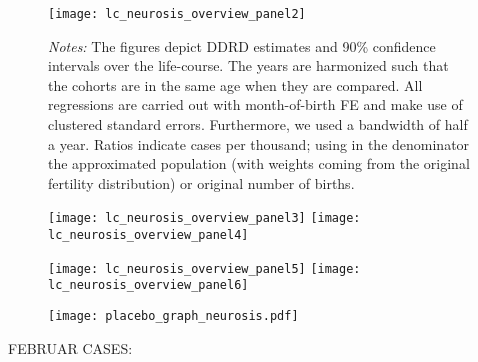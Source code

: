 \begin{landscape}
\begin{figure}[H]
\centering
\begin{minipage}{.9\linewidth}
\texttt{[image: lc\_neurosis\_overview\_panel2]}
{\scriptsize \emph{Notes:} The figures depict DDRD estimates and 90\% confidence intervals over the life-course. The years are harmonized such that the cohorts are in the same age when they are compared. All regressions are carried out with month-of-birth FE and make use of clustered standard errors. Furthermore, we used a bandwidth of half a year. Ratios indicate cases per thousand; using in the denominator the approximated population (with weights coming from the original fertility distribution) or original number of births. \par}
\end{minipage}
\end{figure}
\end{landscape}
\begin{figure}[H]%
	\centering
	\texttt{[image: lc\_neurosis\_overview\_panel3]}
	\texttt{[image: lc\_neurosis\_overview\_panel4]}
\end{figure}
\begin{figure}[H]
	\centering	
	\texttt{[image: lc\_neurosis\_overview\_panel5]}
	\texttt{[image: lc\_neurosis\_overview\_panel6]}
\end{figure}
%
\begin{figure}[H]%
	\centering
	\texttt{[image: placebo\_graph\_neurosis.pdf]}
\end{figure}




%
FEBRUAR CASES:


